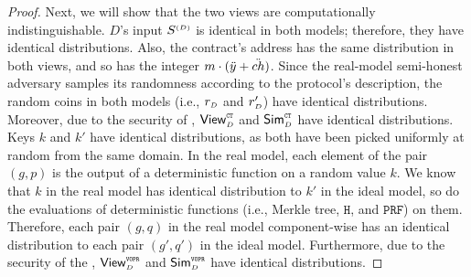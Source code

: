 \begin{proof}
 Next, we will show that the two views are computationally indistinguishable. $D$'s input $S^{\scriptscriptstyle (D)}$ is
 identical in both models; therefore, they have identical distributions. Also, the contract's address has the same distribution in both views, and so has the integer $ m\cdot(\ddot{y}+\ddot{ch})$. Since the real-model semi-honest adversary samples its randomness according to the protocol’s description, the random coins in both models (i.e., $r_{\scriptscriptstyle D}$  and $r'_{\scriptscriptstyle D}$) have identical distributions. Moreover, due to the security of  \ct, $\mathsf{View}^{\scriptscriptstyle \mathtt{CT}}_{\scriptscriptstyle D}$ and $\mathsf{Sim}^{\scriptscriptstyle \mathtt{CT}}_{\scriptscriptstyle D}$ have identical distributions. Keys $k$ and $  k'$ have identical distributions, as both have been picked uniformly at random from the same domain.  In the real model, each element of the pair $(g, p)$ is the output of a deterministic function on a random value $k$. We know that $k$ in the real model has identical distribution to $  k'$ in the ideal model, so do the evaluations of deterministic functions (i.e., Merkle tree, $\mathtt{H}$, and $\mathtt {PRF}$) on them. Therefore, each pair $(g, q)$ in the real model component-wise has an identical distribution to each pair $(g', q')$ in the ideal model.  
 Furthermore, due to the security of the \vopr, $\mathsf{View}^{\scriptscriptstyle \mathtt{VOPR}}_{\scriptscriptstyle D}$ and $\mathsf{Sim}^{\scriptscriptstyle \mathtt{VOPR}}_{\scriptscriptstyle D}$ have identical distributions.
 

\end{proof}
